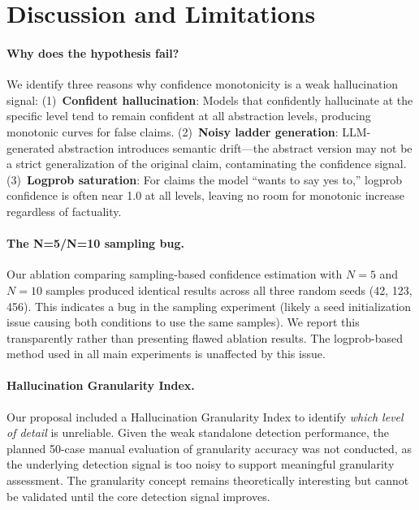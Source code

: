 \documentclass{article}
\begin{document}
\section{Discussion and Limitations}
\label{sec:discussion}

\paragraph{Why does the hypothesis fail?}
We identify three reasons why confidence monotonicity is a weak hallucination signal:
(1)~\textbf{Confident hallucination}: Models that confidently hallucinate at the specific level tend to remain confident at all abstraction levels, producing monotonic curves for false claims.
(2)~\textbf{Noisy ladder generation}: LLM-generated abstraction introduces semantic drift---the abstract version may not be a strict generalization of the original claim, contaminating the confidence signal.
(3)~\textbf{Logprob saturation}: For claims the model ``wants to say yes to,'' logprob confidence is often near 1.0 at all levels, leaving no room for monotonic increase regardless of factuality.

\paragraph{The N=5/N=10 sampling bug.}
Our ablation comparing sampling-based confidence estimation with $N{=}5$ and $N{=}10$ samples produced identical results across all three random seeds (42, 123, 456).
This indicates a bug in the sampling experiment (likely a seed initialization issue causing both conditions to use the same samples).
We report this transparently rather than presenting flawed ablation results.
The logprob-based method used in all main experiments is unaffected by this issue.

\paragraph{Hallucination Granularity Index.}
Our proposal included a Hallucination Granularity Index to identify \emph{which level of detail} is unreliable.
Given the weak standalone detection performance, the planned 50-case manual evaluation of granularity accuracy was not conducted, as the underlying detection signal is too noisy to support meaningful granularity assessment.
The granularity concept remains theoretically interesting but cannot be validated until the core detection signal improves.
\end{document}
